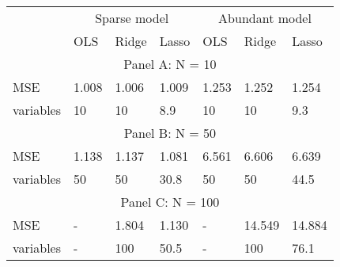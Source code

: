 \documentclass[convert]{standalone}
\begin{document}
\renewcommand{\arraystretch}{1.5}
\begin{tabular}{lllllll}
\cline{2-7}
& \multicolumn{3}{c}{Sparse model} & \multicolumn{3}{c}{Abundant model} \\
\cline{2-7}
& OLS & Ridge & Lasso & OLS & Ridge & Lasso \\ 
\hline 
\multicolumn{7}{c}{Panel A:  N = 10}\\
MSE & 1.008 & 1.006 & 1.009 & 1.253 & 1.252 & 1.254 \\ 
variables & 10 & 10 & 8.9 & 10 & 10 & 9.3 \\ 
\multicolumn{7}{c}{Panel B:  N = 50}\\
MSE & 1.138 & 1.137 & 1.081 & 6.561 & 6.606 & 6.639 \\ 
variables & 50 & 50 & 30.8 & 50 & 50 & 44.5 \\ 
\multicolumn{7}{c}{Panel C:  N = 100}\\
MSE & - & 1.804 & 1.130 & - & 14.549 & 14.884 \\ 
variables & - & 100 & 50.5 & - & 100 & 76.1 \\ 
\hline
\end{tabular}
\end{document}
